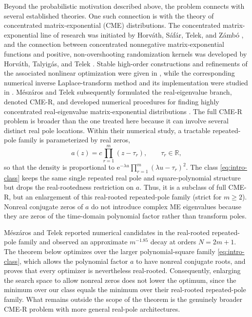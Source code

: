 \documentclass[11pt]{article}
\numberwithin{equation}{section}
\theoremstyle{definition}
\theoremstyle{remark}
\newcommand{\R}{\mathbb R}
\newcommand{\e}{\mathrm e}
\begin{document}
Beyond the probabilistic motivation described above, the problem connects with several established theories. One such connection is with the
theory of concentrated matrix-exponential (CME) distributions. The concentrated matrix-exponential line of research was initiated by Horv\'ath, S\'af\'ar, Telek, and Z\'amb\'o \cite{horvathsafartelekzambo2016}, and the connection between
concentrated nonnegative matrix-exponential functions and positive,
non-overshooting randomization kernels was developed by Horv\'ath,
Talyig\'as, and Telek \cite{horvathtalyigastelek2018}. Stable high-order
constructions and refinements of the associated nonlinear optimization were
given in
\cite{horvathhorvathtelek2020,almousatelek2021}, while the corresponding
numerical inverse Laplace-transform method and its implementation were
studied in \cite{horvathetal2020nilt,almousaetal2022cme}. M\'esz\'aros and
Telek subsequently formulated the real-eigenvalue branch, denoted CME-R,
and developed numerical procedures for finding highly concentrated
real-eigenvalue matrix-exponential distributions \cite{meszarostelek2022}.
The full CME-R problem is broader than the one treated here because it can
involve several distinct real pole locations. Within their numerical study,
a tractable repeated-pole family is parameterized by real zeros,
\[
 a(z)=c\prod_{r=1}^m(z-\tau_r),\qquad \tau_r\in\R,
\]
so that the density is proportional to
$\e^{-\lambda u}\prod_{r=1}^m(\lambda u-\tau_r)^2$. The class
\eqref{eq:intro-class} keeps the same single repeated real pole and
square-polynomial structure but drops the real-rootedness restriction on
$a$. Thus, it is a subclass of full CME-R, but an enlargement of this
real-rooted repeated-pole family (strict for $m\geq2$). Nonreal conjugate
zeros of $a$ do not introduce complex ME eigenvalues because they are zeros
of the time-domain polynomial factor rather than transform poles.

M\'esz\'aros and Telek \cite{meszarostelek2022} reported numerical candidates in the
real-rooted repeated-pole family and observed an approximate $m^{-1.85}$
decay at orders $N=2m+1$. The theorem below optimizes over the larger polynomial-square
family \eqref{eq:intro-class}, which allows the polynomial factor $a$ to have nonreal conjugate roots, and proves that every optimizer is nevertheless
real-rooted. Consequently, enlarging the search space to allow nonreal zeros
does not lower the optimum, since the minimum over our class equals the minimum
over their real-rooted repeated-pole family. What remains outside the scope
of the theorem is the genuinely broader CME-R problem with more general
real-pole architectures.
\end{document}
